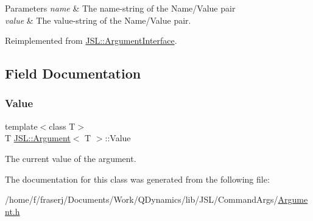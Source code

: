 \begin{DoxyParams}{Parameters}
{\em name} & The name-\/string of the Name/\+Value pair\\
\hline
{\em value} & The value-\/string of the Name/\+Value pair. \\
\hline
\end{DoxyParams}


Reimplemented from \hyperlink{classJSL_1_1ArgumentInterface_a28b487f7a4fa6e721ed6629abe2073f2}{J\+S\+L\+::\+Argument\+Interface}.



\subsection{Field Documentation}
\mbox{\label{classJSL_1_1Argument_a83ada5bfa412192f76dd4290f679defd}} 
\subsubsection{\texorpdfstring{Value}{Value}}
{\footnotesize\ttfamily template$<$class T$>$ \\
T \hyperlink{classJSL_1_1Argument}{J\+S\+L\+::\+Argument}$<$ T $>$\+::Value}



The current value of the argument. 



The documentation for this class was generated from the following file\+:\begin{DoxyCompactItemize}
\item 
/home/f/fraserj/\+Documents/\+Work/\+Q\+Dynamics/lib/\+J\+S\+L/\+Command\+Args/\hyperlink{Argument_8h}{Argument.\+h}\end{DoxyCompactItemize}
